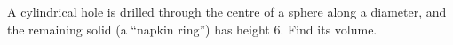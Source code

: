 A cylindrical hole is drilled through the centre of a sphere along a diameter, and the remaining solid (a ``napkin ring'') has height $6$. Find its volume.

